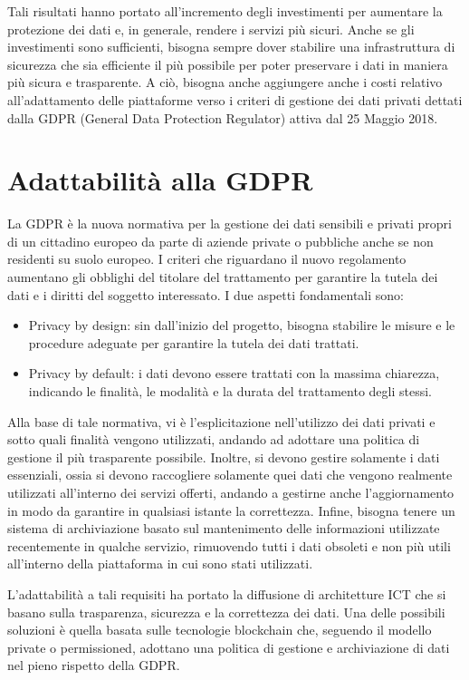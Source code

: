 Tali risultati hanno portato all'incremento degli investimenti per aumentare la protezione dei dati e, in generale, rendere i servizi più sicuri. Anche se gli investimenti sono sufficienti, bisogna sempre dover stabilire una infrastruttura di sicurezza che sia efficiente il più possibile per poter preservare i dati in maniera più sicura e trasparente. A ciò, bisogna anche aggiungere anche i costi relativo all'adattamento delle piattaforme verso i criteri di gestione dei dati privati dettati dalla GDPR (General Data Protection Regulator) attiva dal 25 Maggio 2018. 

\newpage
\section{Adattabilità alla GDPR}
La GDPR  è la nuova normativa per la gestione dei dati sensibili e privati propri di un cittadino europeo da parte di aziende private o pubbliche anche se non residenti su suolo europeo. I criteri che riguardano il nuovo regolamento aumentano gli obblighi del titolare del trattamento per garantire la tutela dei dati e i diritti del soggetto interessato. I due aspetti fondamentali sono:

\begin{itemize}
    \item Privacy by design: sin dall'inizio del progetto, bisogna stabilire le misure e le procedure adeguate per garantire la tutela dei dati trattati.
    \item Privacy by default: i dati devono essere trattati con la massima chiarezza, indicando le finalità, le modalità e la durata del trattamento degli stessi.
\end{itemize}

Alla base di tale normativa, vi è l'esplicitazione nell'utilizzo dei dati privati e sotto quali finalità vengono utilizzati, andando ad adottare una politica di gestione il più trasparente possibile. Inoltre, si devono gestire solamente i dati essenziali, ossia si devono raccogliere solamente quei dati che vengono realmente utilizzati all'interno dei servizi offerti, andando a gestirne anche l'aggiornamento in modo da garantire in qualsiasi istante la correttezza. Infine, bisogna tenere un sistema di archiviazione basato sul mantenimento delle informazioni utilizzate recentemente in qualche servizio, rimuovendo tutti i dati obsoleti e non più utili all'interno della piattaforma in cui sono stati utilizzati. 

L'adattabilità a tali requisiti ha portato la diffusione di architetture ICT che si basano sulla trasparenza, sicurezza e la correttezza dei dati. Una delle possibili soluzioni è quella basata sulle tecnologie blockchain che, seguendo il modello private o permissioned, adottano una politica di gestione e archiviazione di dati nel pieno rispetto della GDPR.

\newpage